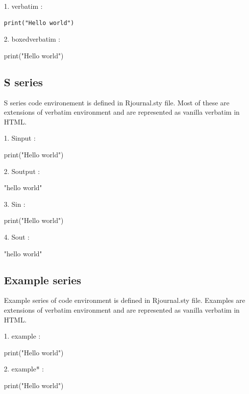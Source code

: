 1. verbatim :

\begin{verbatim}
print("Hello world")
\end{verbatim}


2. boxedverbatim :

\begin{boxedverbatim}
print("Hello world")
\end{boxedverbatim}


\subsection{S series}

S series code environement is defined in Rjournal.sty file. Most of these are
extensions of verbatim environment and are represented as vanilla verbatim in HTML.

1. Sinput :

\begin{Sinput}
print("Hello world")
\end{Sinput}


2. Soutput :

\begin{Soutput}
[1] "hello world"
\end{Soutput}


3. Sin :

\begin{Sin}
print("Hello world")
\end{Sin}


4. Sout :
\begin{Sout}
[1] "hello world"
\end{Sout}


\subsection{Example series}
Example series of code environment is defined in Rjournal.sty file. Examples are
extensions of verbatim environment and are represented as vanilla verbatim in HTML.

1. example :

\begin{example}
print("Hello world")
\end{example}


2. example* :

\begin{example*}
print("Hello world")
\end{example*}


